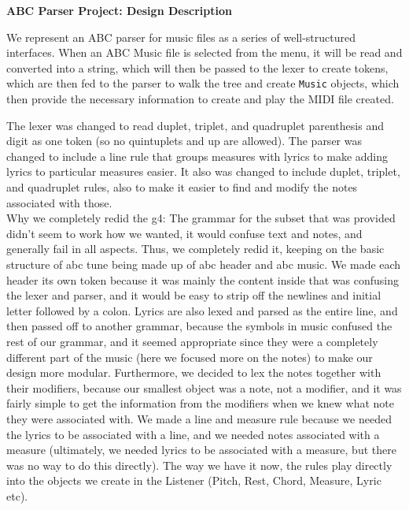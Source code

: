 \documentclass[12pt]{book}
\begin{document}
\phantom{xxx}
\bigskip
\centerline{{\large \bf ABC Parser Project: Design Description }}
\bigskip\bigskip


We represent an ABC parser for music files as a series of well-structured interfaces. When an ABC Music file is selected from the menu, it will be read and converted into a string, which will then be passed to the lexer to create tokens, which are then fed to the parser to walk the tree and create {\tt Music} objects, which then provide the necessary information to create and play the MIDI file created.

\bigskip
{}
\bigskip

The lexer was changed to read duplet, triplet, and quadruplet parenthesis and digit as one token (so no quintuplets and up are allowed). The parser was changed to include a line rule that groups measures with lyrics to make adding lyrics to particular measures easier. It also was changed to include duplet, triplet, and quadruplet rules, also to make it easier to find and modify the notes associated with those.\\

Why we completely redid the g4: The grammar for the subset that was provided didn’t seem to work how we wanted, it would confuse text and notes, and generally fail in all aspects. Thus, we completely redid it, keeping on the basic structure of abc tune being made up of abc header and abc music. 
We made each header its own token because it was mainly the content inside that was confusing the lexer and parser, and it would be easy to strip off the newlines and initial letter followed by a colon. Lyrics are also lexed and parsed as the entire line, and then passed off to another grammar, because the symbols in music confused the rest of our grammar, and it seemed appropriate since they were a completely different part of the music (here we focused more on the notes) to make our design more modular.
Furthermore, we decided to lex the notes together with their modifiers, because our smallest object was a note, not a modifier, and it was fairly simple to get the information from the modifiers when we knew what note they were associated with. 
We made a line and measure rule because we needed the lyrics to be associated with a line, and we needed notes associated with a measure (ultimately, we needed lyrics to be associated with a measure, but there was no way to do this directly). 
The way we have it now, the rules play directly into the objects we create in the Listener (Pitch, Rest, Chord, Measure, Lyric etc). \\
\end{document}
